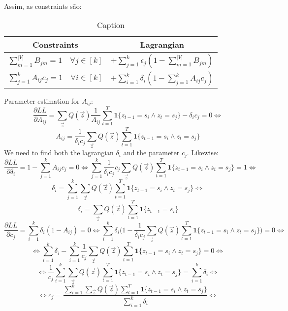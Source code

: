 \documentclass{article}
\begin{document}
Assim, as constraints são:
\begin{table}[!htb]
    \centering
    \begin{tabular}{c|c}
    \toprule
        Constraints & Lagrangian \\
        \midrule
         $\sum_{m=1}^{|V|} B_{jm}=1 \quad \forall j\in[k]$ & $+\sum_{j=1}^k\epsilon_j (1-\sum_{m=1}^{|V|} B_{jm})$ \\
         $\sum_{j=1}^k A_{ij}c_j=1 \quad \forall i\in[k]$ & $+\sum_{i=1}^k\delta_i (1-\sum_{j=1}^k A_{ij}c_j)$ \\
         \bottomrule
    \end{tabular}
    \caption{Caption}
    \label{tab:my_label}
\end{table}

Parameter estimation for $A_{ij}$:
\[ \dfrac{\partial LL}{\partial A_{ij}}= \sum_{\Vec{z}}Q(\Vec{z}) \dfrac{1}{A_{ij}}\sum_{t=1}^T  \textbf{1}\{z_{t-1}=s_i \wedge z_t=s_j\}- \delta_i c_j = 0 \Longleftrightarrow\]
\begin{equation}
    A_{ij} = \dfrac{1}{\delta_i c_j} \sum_{\Vec{z}}Q(\Vec{z}) \sum_{t=1}^T  \textbf{1}\{z_{t-1}=s_i \wedge z_t=s_j\}
    \label{Aij}
\end{equation}
We need to find both the lagrangian $\delta_i$ and the parameter $c_j$. Likewise:
\[ \dfrac{\partial LL}{\partial \delta_i}= 1-\sum_{j=1}^k A_{ij}c_j = 0 \Longleftrightarrow \sum_{j=1}^k \dfrac{1}{\delta_i c_j}c_j \sum_{\Vec{z}}Q(\Vec{z}) \sum_{t=1}^T  \textbf{1}\{z_{t-1}=s_i \wedge z_t=s_j\} = 1 \Longleftrightarrow \]
\[\delta_i = \sum_{j=1}^k \sum_{\Vec{z}}Q(\Vec{z}) \sum_{t=1}^T  \textbf{1}\{z_{t-1}=s_i \wedge z_t=s_j\} \Longleftrightarrow\]
\begin{equation}
   \delta_i = \sum_{\Vec{z}}Q(\Vec{z}) \sum_{t=1}^T  \textbf{1}\{z_{t-1}=s_i\}
   \label{deltai}
\end{equation}
\[ \dfrac{\partial LL}{\partial c_j}= \sum_{i=1}^k \delta_i (1-A_{ij}) = 0 \Longleftrightarrow \sum_{i=1}^k \delta_i \Bigg(1- \dfrac{1}{\delta_i c_j} \sum_{\Vec{z}}Q(\Vec{z}) \sum_{t=1}^T  \textbf{1}\{z_{t-1}=s_i \wedge z_t=s_j\}\Bigg) = 0 \Longleftrightarrow \]
\[\Longleftrightarrow \sum_{i=1}^k \delta_i -\sum_{i=1}^k  \dfrac{1}{c_j} \sum_{\Vec{z}}Q(\Vec{z}) \sum_{t=1}^T  \textbf{1}\{z_{t-1}=s_i \wedge z_t=s_j\} = 0 \Longleftrightarrow\]
\[\Longleftrightarrow \dfrac{1}{c_j}\sum_{i=1}^k \sum_{\Vec{z}}Q(\Vec{z}) \sum_{t=1}^T  \textbf{1}\{z_{t-1}=s_i \wedge z_t=s_j\} = \sum_{i=1}^k \delta_i \Longleftrightarrow\]
\[\Longleftrightarrow c_j =\dfrac{\sum_{i=1}^k \sum_{\Vec{z}}Q(\Vec{z}) \sum_{t=1}^T  \textbf{1}\{z_{t-1}=s_i \wedge z_t=s_j\}}{\sum_{i=1}^k \delta_i} \Longleftrightarrow\]
\end{document}
